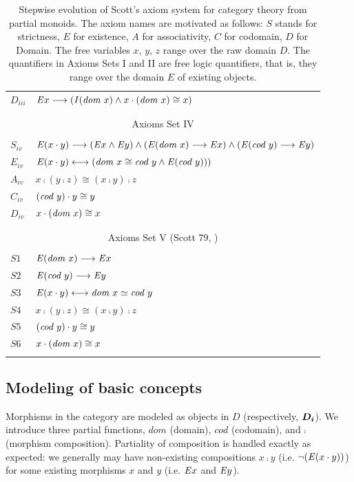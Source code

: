 \begin{table}[htp]
\begin{tabular}{ll}
 $D_{iii}$ & $\mathit{E} x \longrightarrow (\textit{I\/}(\textit{dom \/} x) \wedge x \cdot (\textit{dom \/} x) \cong x)$ \\
\\
\hline
\\
\multicolumn{2}{c}{Axioms Set IV} \\
\\
$S_{iv}$ & $\mathit{E}(x \cdot y) \longrightarrow (\mathit{E} x \wedge \mathit{E} y) \wedge (\mathit{E} (\textit{dom \/} x) \longrightarrow \mathit{E}
        x) \wedge (\mathit{E} (\textit{cod \/} y) \longrightarrow \mathit{E}
        y)$ \\
 $E_{iv}$ & $\mathit{E}(x \cdot y) \longleftrightarrow (\textit{dom \/} x \cong \textit{cod \/} y \wedge \mathit{E} (\textit{cod \/} y)))$ \\
 $A_{iv}$ & $x\comp (y \comp z) \cong (x \comp y) \comp z$ \\
 $C_{iv}$ & $(\textit{cod \/} y) \cdot y \cong y$ \\
 $D_{iv}$ & $x \cdot (\textit{dom \/} x) \cong x$  \\
\\
\hline
\\
\multicolumn{2}{c}{Axioms Set V (Scott 79, \cite{Scott79})} \\
\\
$S1$ & $\mathit{E} (\textit{dom \/} x) \longrightarrow \mathit{E} x$ \\
$S2$ & $\mathit{E} (\textit{cod \/} y) \longrightarrow \mathit{E} y$ \\
$S3$ & $\mathit{E}(x \cdot y) \longleftrightarrow \textit{dom \/} x \simeq \textit{cod \/} y$ \\
$S4$ & $x\comp (y \comp z) \cong (x \comp y) \comp z$ \\
$S5$ & $(\textit{cod \/} y) \cdot y \cong y$ \\
$S6$ & $x \cdot (\textit{dom \/} x) \cong x$  \\
\\
\hline
\end{tabular}
\caption{Stepwise evolution of Scott's \cite{Scott79} axiom
  system for category theory from partial monoids. The axiom names are
  motivated as follows: 
  $S$ stands for strictness, $E$ for existence, $A$ for associativity, $C$ for
  codomain, $D$ for Domain. The free variables $x$, $y$, $z$ range over
  the raw domain $D$. The quantifiers in Axioms Sets I and II are
  free logic quantifiers, that is, they range over the domain $E$ of
  existing objects. \label{axioms-sets-1}}
\end{table}





\subsection{Modeling of basic concepts}
Morphisms in the category are modeled as objects in $D$ (respectively,
$\boldsymbol{D_i}$). We introduce three partial functions, 
$dom$ (domain), $cod$ (codomain), and $\comp$ (morphism composition). 
Partiality of composition is handled exactly as expected: we generally may have 
non-existing compositions $x\comp y$ (i.e. $\neg(\mathit{E}(x\cdot y))$) for some existing  
morphisms $x$ and $y$ (i.e. $\mathit{E} x$ and $\mathit{E} y$).

